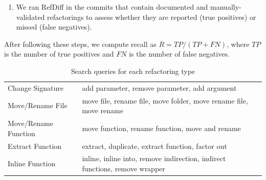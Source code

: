 \documentclass[10pt,journal,compsoc]{IEEEtran}
\begin{document}
\begin{enumerate}


\item We ran RefDiff in the commits that contain documented and manually-validated refactorings to assess whether they are reported (true positives) or missed (false negatives). 
\end{enumerate}

After following these steps, we compute recall as $R = \mathit{TP} / (\mathit{TP} + \mathit{FN})$, where $\mathit{TP}$ is the number of true positives and $\mathit{FN}$ is the number of false negatives.

\begin{table}[htbp]
\renewcommand{\arraystretch}{1.2}
\caption{Search queries for each refactoring type}
\label{TabSearchQueries}
\centering
\begin{tabular}{@{}lp{5cm}@{}}
\toprule
Change Signature & add parameter, remove parameter, add argument \\
\addlinespace
Move/Rename File & move file, rename file, move folder, move rename file, move rename \\
\addlinespace
Move/Rename Function & move function, rename function, move and rename\\
\addlinespace
Extract Function & extract, duplicate, extract function, factor out \\
\addlinespace
Inline Function & inline, inline into, remove indirection, indirect functions, remove wrapper \\
\bottomrule
\end{tabular}
\end{table}


\end{document}
